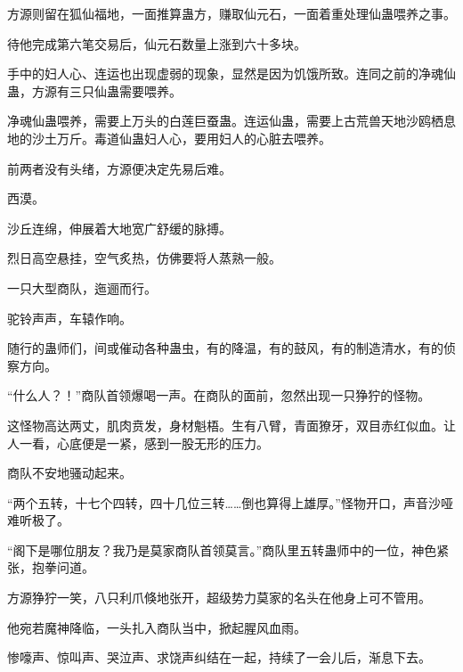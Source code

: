 \begin{this_body}
方源则留在狐仙福地，一面推算蛊方，赚取仙元石，一面着重处理仙蛊喂养之事。

待他完成第六笔交易后，仙元石数量上涨到六十多块。

手中的妇人心、连运也出现虚弱的现象，显然是因为饥饿所致。连同之前的净魂仙蛊，方源有三只仙蛊需要喂养。

净魂仙蛊喂养，需要上万头的白莲巨蚕蛊。连运仙蛊，需要上古荒兽天地沙鸥栖息地的沙土万斤。毒道仙蛊妇人心，要用妇人的心脏去喂养。

前两者没有头绪，方源便决定先易后难。

西漠。

沙丘连绵，伸展着大地宽广舒缓的脉搏。

烈日高空悬挂，空气炙热，仿佛要将人蒸熟一般。

一只大型商队，迤逦而行。

驼铃声声，车辕作响。

随行的蛊师们，间或催动各种蛊虫，有的降温，有的鼓风，有的制造清水，有的侦察方向。

“什么人？！”商队首领爆喝一声。在商队的面前，忽然出现一只狰狞的怪物。

这怪物高达两丈，肌肉贲发，身材魁梧。生有八臂，青面獠牙，双目赤红似血。让人一看，心底便是一紧，感到一股无形的压力。

商队不安地骚动起来。

“两个五转，十七个四转，四十几位三转……倒也算得上雄厚。”怪物开口，声音沙哑难听极了。

“阁下是哪位朋友？我乃是莫家商队首领莫言。”商队里五转蛊师中的一位，神色紧张，抱拳问道。

方源狰狞一笑，八只利爪倏地张开，超级势力莫家的名头在他身上可不管用。

他宛若魔神降临，一头扎入商队当中，掀起腥风血雨。

惨嚎声、惊叫声、哭泣声、求饶声纠结在一起，持续了一会儿后，渐息下去。

\end{this_body}

